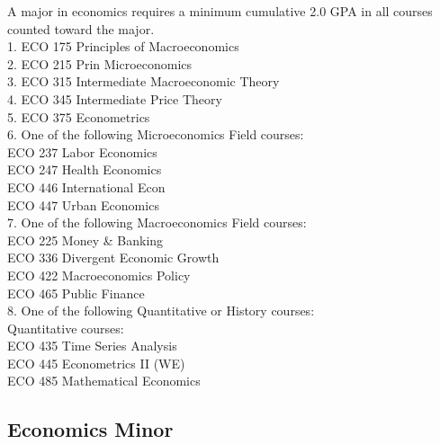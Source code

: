 \documentclass[
  letterpaper,
]{scrbook}
\begin{document}
A major in economics requires a minimum cumulative 2.0 GPA in all
courses counted toward the major.\\
1. ECO 175 Principles of Macroeconomics\\
2. ECO 215 Prin Microeconomics\\
3. ECO 315 Intermediate Macroeconomic Theory\\
4. ECO 345 Intermediate Price Theory\\
5. ECO 375 Econometrics\\
6. One of the following Microeconomics Field courses:\\
ECO 237 Labor Economics\\
ECO 247 Health Economics\\
ECO 446 International Econ\\
ECO 447 Urban Economics\\
7. One of the following Macroeconomics Field courses:\\
ECO 225 Money \& Banking\\
ECO 336 Divergent Economic Growth\\
ECO 422 Macroeconomics Policy\\
ECO 465 Public Finance\\
8. One of the following Quantitative or History courses:\\
Quantitative courses:\\
ECO 435 Time Series Analysis\\
ECO 445 Econometrics II (WE)\\
ECO 485 Mathematical Economics

\subsection{Economics Minor}\label{economics-minor}
\end{document}
